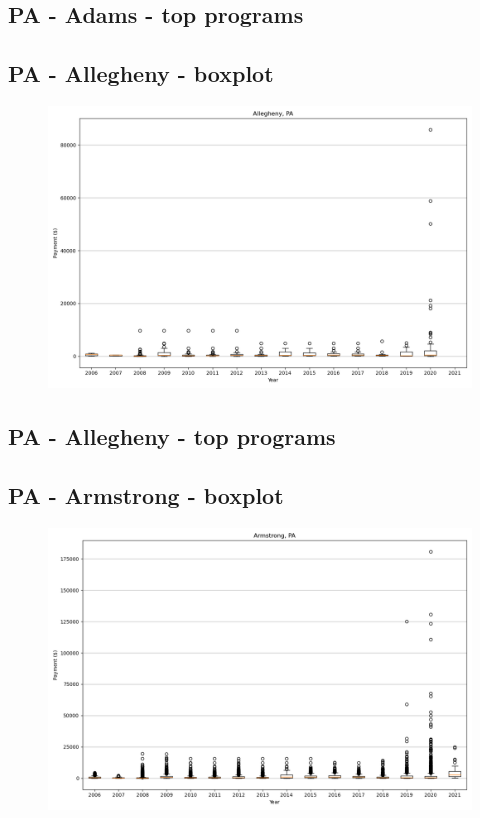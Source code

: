 \subsection*{PA - Adams - top programs}

\newpage
\subsection*{PA - Allegheny - boxplot}
\begin{figure}[h]
\centering
\includegraphics[width=7in]{../output/boxplots/counties/Allegheny-PA_boxplot.png}
\end{figure}


\subsection*{PA - Allegheny - top programs}

\newpage
\subsection*{PA - Armstrong - boxplot}
\begin{figure}[h]
\centering
\includegraphics[width=7in]{../output/boxplots/counties/Armstrong-PA_boxplot.png}
\end{figure}


